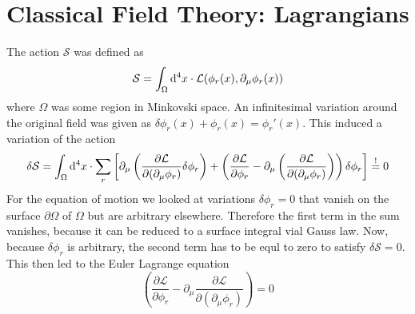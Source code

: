 \documentclass{include/thesisclass}
\newcommand{\LL}{\mathcal{L}}
\newcommand{\SSS}{\mathcal{S}}
\newcommand{\cc}{\cdot}
\newcommand{\dd}{{\rm d}}
\newcommand{\p}{\partial}
\newcommand{\soll}{\overset{!}{=}}
\begin{document}
\chapter{Classical Field Theory: Lagrangians}

The action $\SSS$ was defined as
\[ \SSS = \int_\Omega \dd^4 x \cc \LL( \phi_r(x), \p_\mu \phi_r(x))\]
where $\Omega$ was some region in Minkovski space. An infinitesimal variation around the original field was given as $\delta \phi_r(x) + \phi_r(x) = \phi_r'(x)$. This induced a variation of the action
\[ \delta \SSS = \int_\Omega \dd^4 x \cc \sum_r \left[ \p_\mu \left( \frac{\p \LL}{\p (\p_\mu \phi_r)} \delta \phi_r \right) + \left( \frac{ \p \LL}{\p \phi_r} - \p_\mu \left( \frac{\p \LL}{\p (\p_\mu \phi_r)}\right) \right)  \delta \phi_r\right]\soll 0 \]
For the equation of motion we looked at variations $\delta \phi_r = 0$ that vanish on the surface $\p \Omega$ of $\Omega$ but are arbitrary elsewhere. Therefore the first term in the sum vanishes, because it can be reduced to a surface integral vial Gauss law. Now, because $\delta \phi_r$ is arbitrary, the second term has to be equl to zero to satisfy $\delta \SSS = 0$. This then led to the Euler Lagrange equation
\[ \left( \frac{\p \LL}{\p \phi_r} - \p_\mu \frac{\p \LL}{\p ( \p_\mu \phi_r)} \right) = 0\] 
\end{document}
